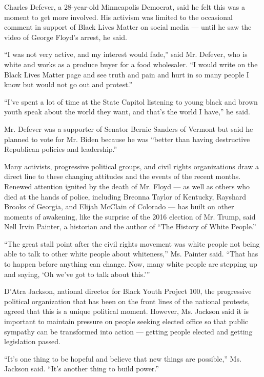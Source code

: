 Charles Defever, a 28-year-old Minneapolis Democrat, said he felt this
was a moment to get more involved. His activism was limited to the
occasional comment in support of Black Lives Matter on social media ---
until he saw the video of George Floyd's arrest, he said.

``I was not very active, and my interest would fade,'' said Mr. Defever,
who is white and works as a produce buyer for a food wholesaler. ``I
would write on the Black Lives Matter page and see truth and pain and
hurt in so many people I know but would not go out and protest.''

``I've spent a lot of time at the State Capitol listening to young black
and brown youth speak about the world they want, and that's the world I
have,'' he said.

Mr. Defever was a supporter of Senator Bernie Sanders of Vermont but
said he planned to vote for Mr. Biden because he was ``better than
having destructive Republican policies and leadership.''

Many activists, progressive political groups, and civil rights
organizations draw a direct line to these changing attitudes and the
events of the recent months. Renewed attention ignited by the death of
Mr. Floyd --- as well as others who died at the hands of police,
including Breonna Taylor of Kentucky, Rayshard Brooks of Georgia, and
Elijah McClain of Colorado --- has built on other moments of awakening,
like the surprise of the 2016 election of Mr. Trump, said Nell Irvin
Painter, a historian and the author of ``The History of White People.''

``The great stall point after the civil rights movement was white people
not being able to talk to other white people about whiteness,'' Ms.
Painter said. ``That has to happen before anything can change. Now, many
white people are stepping up and saying, `Oh we've got to talk about
this.'''

D'Atra Jackson, national director for Black Youth Project 100, the
progressive political organization that has been on the front lines of
the national protests, agreed that this is a unique political moment.
However, Ms. Jackson said it is important to maintain pressure on people
seeking elected office so that public sympathy can be transformed into
action --- getting people elected and getting legislation passed.

``It's one thing to be hopeful and believe that new things are
possible,'' Ms. Jackson said. ``It's another thing to build power.''

